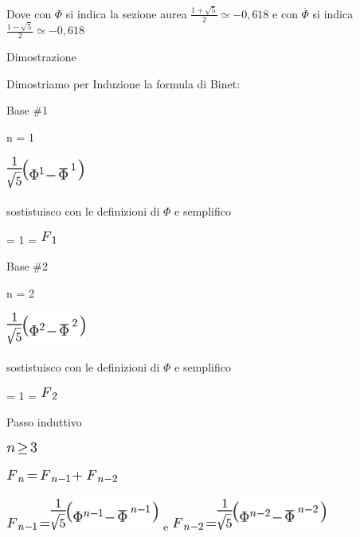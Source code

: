 \documentclass{article}
\begin{document}
Dove con $\Phi$ si indica la sezione aurea $\frac{1+\sqrt{5}}{2} \simeq -0,618$ e con $\overline{\Phi}$ si indica $\frac{1-\sqrt{5}}{2} \simeq -0,618$

{Dimostrazione}

{Dimostriamo per Induzione la formula di Binet:}

{Base \#1}

{n = 1}

\includegraphics{images/image9.png}

{}

{}

{sostistuisco con le definizioni di $\Phi$ e semplifico}

{= 1 = }\includegraphics{images/image10.png}

{Base \#2}

{n = 2}

\includegraphics{images/image11.png}

{sostistuisco con le definizioni di $\Phi$ e semplifico}

{= 1 = }\includegraphics{images/image12.png}

{Passo induttivo}

\includegraphics{images/image13.png}

\includegraphics{images/image14.png}{~}

\includegraphics{images/image15.png}\includegraphics{images/image16.png}{~e
}\includegraphics{images/image17.png}\includegraphics{images/image18.png}
\end{document}
